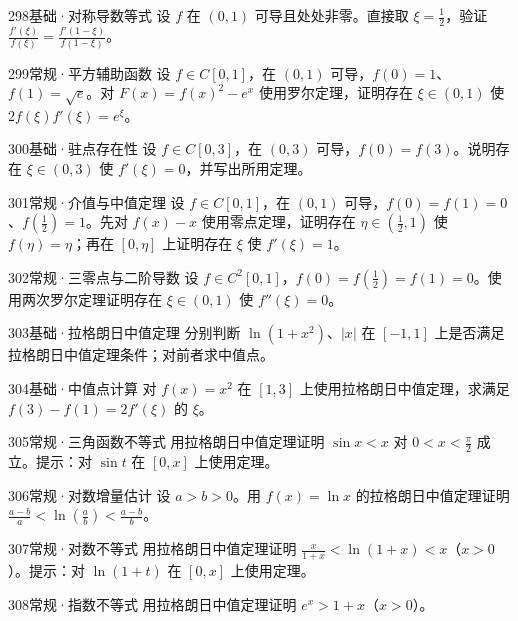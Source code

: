 \begin{exercise}{298}{基础·对称导数等式}
设 $f$ 在 $(0,1)$ 可导且处处非零。直接取 $\xi=\frac{1}{2}$，验证 $\frac{f'(\xi)}{f(\xi)}=\frac{f'(1-\xi)}{f(1-\xi)}$。
\end{exercise}
\begin{exercise}{299}{常规·平方辅助函数}
设 $f\in C[0,1]$，在 $(0,1)$ 可导，$f(0)=1$、$f(1)=\sqrt e$。对 $F(x)=f(x)^2-e^x$ 使用罗尔定理，证明存在 $\xi\in(0,1)$ 使 $2f(\xi)f'(\xi)=e^\xi$。
\end{exercise}
\begin{exercise}{300}{基础·驻点存在性}
设 $f\in C[0,3]$，在 $(0,3)$ 可导，$f(0)=f(3)$。说明存在 $\xi\in(0,3)$ 使 $f'(\xi)=0$，并写出所用定理。
\end{exercise}
\begin{exercise}{301}{常规·介值与中值定理}
设 $f\in C[0,1]$，在 $(0,1)$ 可导，$f(0)=f(1)=0$、$f(\frac{1}{2})=1$。先对 $f(x)-x$ 使用零点定理，证明存在 $\eta\in(\frac{1}{2},1)$ 使 $f(\eta)=\eta$；再在 $[0,\eta]$ 上证明存在 $\xi$ 使 $f'(\xi)=1$。
\end{exercise}
\begin{exercise}{302}{常规·三零点与二阶导数}
设 $f\in C^2[0,1]$，$f(0)=f(\frac{1}{2})=f(1)=0$。使用两次罗尔定理证明存在 $\xi\in(0,1)$ 使 $f''(\xi)=0$。
\end{exercise}
\begin{exercise}{303}{基础·拉格朗日中值定理}
分别判断 $\ln(1+x^2)$、$|x|$ 在 $[-1,1]$ 上是否满足拉格朗日中值定理条件；对前者求中值点。
\end{exercise}
\begin{exercise}{304}{基础·中值点计算}
对 $f(x)=x^2$ 在 $[1,3]$ 上使用拉格朗日中值定理，求满足 $f(3)-f(1)=2f'(\xi)$ 的 $\xi$。
\end{exercise}
\begin{exercise}{305}{常规·三角函数不等式}
用拉格朗日中值定理证明 $\sin x<x$ 对 $0<x<\frac{\pi}{2}$ 成立。提示：对 $\sin t$ 在 $[0,x]$ 上使用定理。
\end{exercise}
\begin{exercise}{306}{常规·对数增量估计}
设 $a>b>0$。用 $f(x)=\ln x$ 的拉格朗日中值定理证明 $\frac{a-b}{a}<\ln(\frac{a}{b})<\frac{a-b}{b}$。
\end{exercise}
\begin{exercise}{307}{常规·对数不等式}
用拉格朗日中值定理证明 $\frac{x}{1+x}<\ln(1+x)<x$（$x>0$）。提示：对 $\ln(1+t)$ 在 $[0,x]$ 上使用定理。
\end{exercise}
\begin{exercise}{308}{常规·指数不等式}
用拉格朗日中值定理证明 $e^x>1+x$（$x>0$）。
\end{exercise}
